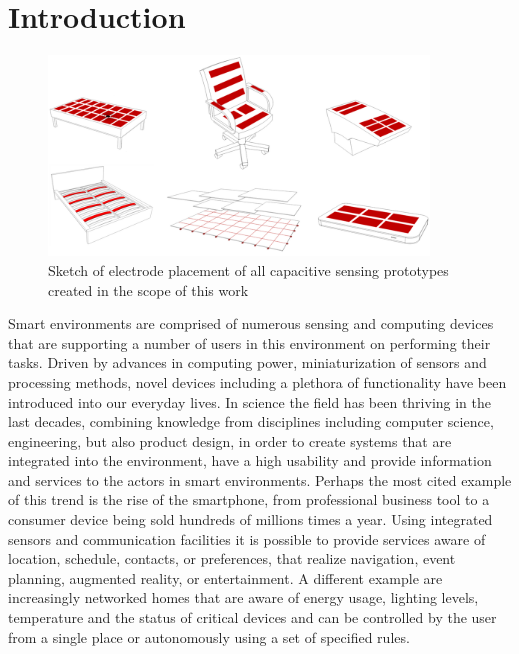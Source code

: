 \chapter{Introduction}
\begin{figure}[h]
\centering
\includegraphics[width=0.9\textwidth]{images/all_protos}
\caption{Sketch of electrode placement of all capacitive sensing prototypes created in the scope of this work}
\label{fig:all_protos}
\end{figure}
Smart environments are comprised of numerous sensing and computing devices that are supporting a number of users in this environment on performing their tasks. Driven by advances in computing power, miniaturization of sensors and processing methods, novel devices including a plethora of functionality have been introduced into our everyday lives.  In science the field has been thriving in the last decades, combining knowledge from disciplines including computer science, engineering, but also product design, in order to create systems that are integrated into the environment, have a high usability and provide information and services to the actors in smart environments. Perhaps the most cited example of this trend is the rise of the smartphone, from professional business tool to a consumer device being sold hundreds of millions times a year. Using integrated sensors and communication facilities it is possible to provide services aware of location, schedule, contacts, or preferences, that realize navigation, event planning, augmented reality, or entertainment. A different example are increasingly networked homes that are aware of energy usage, lighting levels, temperature and the status of critical devices and can be controlled by the user from a single place or autonomously using a set of specified rules. 

